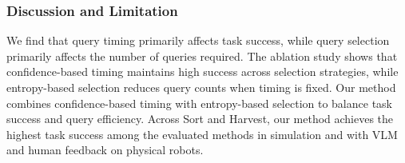 



\subsubsection{Discussion and Limitation}\label{exp:discussion}
We find that query timing primarily affects task success, while query selection primarily affects the number of queries required. The ablation study shows that confidence-based timing maintains high success across selection strategies, while entropy-based selection reduces query counts when timing is fixed. Our method combines confidence-based timing with entropy-based selection to balance task success and query efficiency. Across Sort and Harvest, our method achieves the highest task success among the evaluated methods in simulation and with VLM and human feedback on physical robots.


